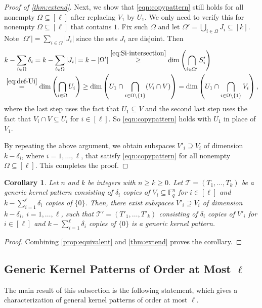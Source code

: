 \documentclass[11pt]{article}
\theoremstyle{plain}
\newtheorem{cor}[thm]{Corollary}
\theoremstyle{definition}
\theoremstyle{remark}
\newcommand{\F}{\mathbb{F}}
\begin{document}
\begin{proof}[Proof of \cref{thm:extend}]
Next, we show that \eqref{eqn:copypattern} still holds for all nonempty $\Omega\subseteq [\ell]$ after replacing $V_1$ by $U_1$. We only need to verify this for nonempty $\Omega\subseteq [\ell]$ that contains $1$. 
Fix such $\Omega$ and let $\Omega'=\bigcup_{i\in \Omega} J_i\subseteq [k]$.
Note $|\Omega'|=\sum_{i\in \Omega} |J_i|$ since the sets $J_i$ are disjoint.
Then
\begin{align*}
&k-\sum_{i\in \Omega}\delta_i
=k-\sum_{i\in \Omega}|J_i|
=k-|\Omega'|
\stackrel{\eqref{eq:Si-intersection}}{\geq} 
\dim\left(\bigcap_{i\in \Omega'}S'_i\right)\\
&\stackrel{\eqref{eq:def-Ui}}{=}\dim\left(\bigcap_{i\in \Omega} U_i\right)\geq 
\dim\left(U_1\cap \bigcap_{i\in \Omega\setminus \{1\}}(V_i\cap V)\right)
=\dim\left(U_1\cap \bigcap_{i\in \Omega\setminus \{1\}} V_i \right),
\end{align*}
where the last step uses the fact that $U_1\subseteq V$ and the second last step uses the fact that $V_i\cap V\subseteq U_i$ for $i\in [\ell]$.
So \eqref{eqn:copypattern} holds with $U_1$ in place of $V_1$.

By repeating the above argument, we obtain subspaces $V'_i\supseteq V_i$ of dimension $k-\delta_i$, where $i=1,\dots,\ell$, that satisfy \eqref{eqn:copypattern} for all nonempty $\Omega\subseteq [\ell]$. This completes the proof.
\end{proof}
 
\begin{cor}\label{l-gkp-max}
Let $n$ and $k$ be integers with $n\ge k\geq 0$. 
Let $\mathcal{T}=(T_1,\ldots,T_k)$ be a generic kernel pattern consisting of $\delta_i$ copies of $V_i\subseteq \F_q^n$ for $i\in [\ell]$ and $k-\sum_{i=1}^\ell \delta_i$ copies of $\{0\}$. Then, 
there exist subspaces $V'_i\supseteq V_i$ of dimension $k-\delta_i$, $i=1,\dots,\ell$,
such that $\mathcal{T'}=(T'_1,\ldots,T'_k)$ consisting of $\delta_i$ copies of $V'_i$ for $i\in[\ell]$ and $k-\sum_{i=1}^\ell \delta_i$ copies of $\{0\}$ is a generic kernel pattern.
\end{cor}
\begin{proof}
Combining \cref{prop:equivalent} and \cref{thm:extend} proves the corollary.
\end{proof}

\subsection{Generic Kernel Patterns of Order at Most $\ell$}

The main result of this subsection is the following statement, which gives a characterization of general kernel patterns of order at most $\ell$.
\end{document}
